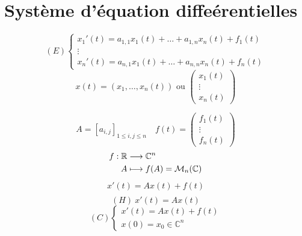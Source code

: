 \chapter{Système d'équation diffeérentielles}
\[
    (E) 
    \begin{cases}
        x_1'(t) = a_{1,1}x_1(t) + \ldots + a_{1,n}x_n(t) + f_1(t)\\
        \vdots\\
        x_n'(t) = a_{n,1}x_1(t) + \ldots + a_{n,n}x_n(t) + f_n(t)
    \end{cases}
\] 
\[
x(t) = (x_1, \ldots, x_n(t)) \text{ ou } \begin{pmatrix} x_1(t) \\ \vdots \\ x_n(t) \end{pmatrix} 
\] 

\[
    A = [a_{i,j}]_{1 \le i, j \le n} \quad f(t) = \begin{pmatrix} f_1(t) \\ \vdots \\ f_n(t) \end{pmatrix} 
\] 
\begin{align*}
    f: \mathbb{R} &\longrightarrow \mathbb{C}^n \\
    A &\longmapsto f(A) = \mathcal{M}_n(\mathbb{C})
\end{align*}
\begin{align*}
    x'(t) = Ax(t) + f(t)\\
\end{align*}
\[
    (H) \: x'(t) = Ax(t)
\] 
\[
    (C) \begin{cases}
        x'(t) = Ax(t) + f(t)\\
        x(0) = x_0 \in \mathbb{C}^n
    \end{cases}
\] 


